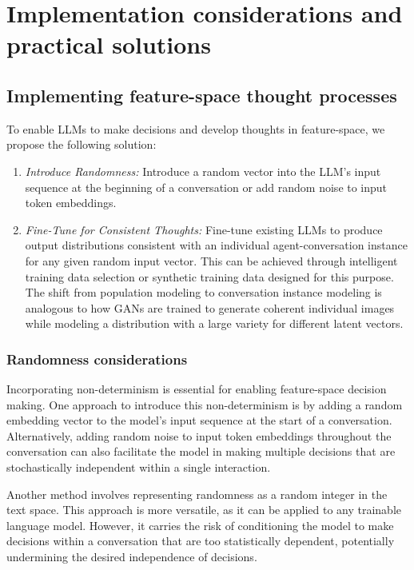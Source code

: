 \documentclass{article}
\begin{document}
\section{Implementation considerations and practical solutions}
\label{sec:solutions}

\subsection{Implementing feature-space thought processes}
To enable LLMs to make decisions and develop thoughts in feature-space, we propose the following solution:

\begin{enumerate}
    \item \textit{Introduce Randomness:} Introduce a random vector into the LLM's input sequence at the beginning of a conversation or add random noise to input token embeddings. 
    \item \textit{Fine-Tune for Consistent Thoughts:} Fine-tune existing LLMs to produce output distributions consistent with an individual agent-conversation instance for any given random input vector. This can be achieved through intelligent training data selection or synthetic training data designed for this purpose. The shift from population modeling to conversation instance modeling is analogous to how GANs are trained to generate coherent individual images while modeling a distribution with a large variety for different latent vectors.
\end{enumerate}

\subsubsection{Randomness considerations}
Incorporating non-determinism is essential for enabling feature-space decision making. One approach to introduce this non-determinism is by adding a random embedding vector to the model's input sequence at the start of a conversation. Alternatively, adding random noise to input token embeddings throughout the conversation can also facilitate the model in making multiple decisions that are stochastically independent within a single interaction.

Another method involves representing randomness as a random integer in the text space. This approach is more versatile, as it can be applied to any trainable language model. However, it carries the risk of conditioning the model to make decisions within a conversation that are too statistically dependent, potentially undermining the desired independence of decisions.
\end{document}
